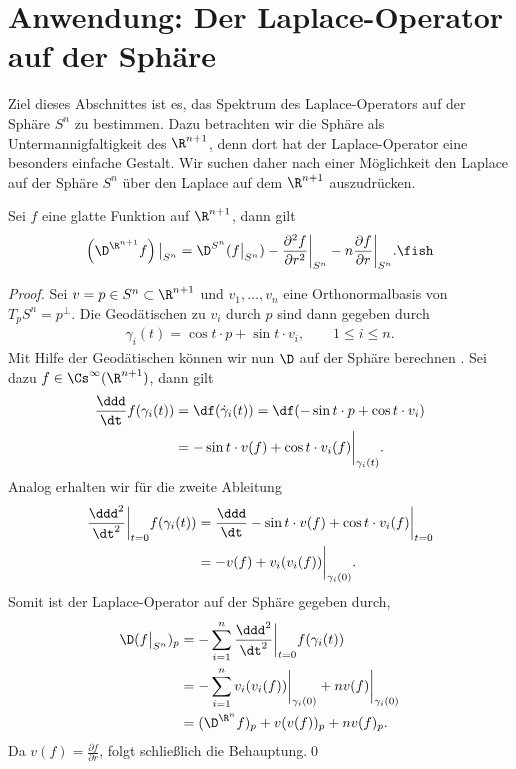\documentclass[%
	paper=a5,%
	fleqn,%
	DIV=18,%
	BCOR=0mm,
	fontsize=11pt,
	titlepage=false,%
	bibliography=totoc,
	DIV=18,%
	twoside=true,
	pdftitle=Riemannsche Geometrie,
	pdfauthor=Uwe Semmelmann,
	numbers=noendperiod]%
	{scrbook}
\begin{document}
\section{Anwendung: Der Laplace-Operator auf der Sphäre}

Ziel dieses Abschnittes ist es, das Spektrum des Laplace-Operators auf der Sphäre $S^n$ zu bestimmen. Dazu betrachten wir die Sphäre als Untermannigfaltigkeit des $\R^{n+1}$, denn dort hat der Laplace-Operator eine besonders einfache Gestalt.
Wir suchen daher nach einer Möglichkeit den Laplace auf der Sphäre $S^n$ über den Laplace auf dem $\R^{n+1}$ auszudrücken.

\begin{prop}
Sei $f$ eine glatte Funktion auf $\R^{n+1}$, dann gilt
\begin{align*}
\left(\D^{\R^{n+1}}f\right)\big|_{S^n}  = 
\D^{S^n}(f\big|_{S^n}) - \frac{\partial^2 f}{\partial r^2}\bigg|_{S^n} - 
n\frac{\partial f}{\partial r}\bigg|_{S^n}.\fish
\end{align*}
\end{prop}

\begin{proof}
Sei $v=p\in S^n\subset\R^{n+1}$ und $v_{1},\ldots,v_{n}$ eine Orthonormalbasis von $T_{p}S^n = p^\bot$. Die Geodätischen zu $v_{i}$ durch $p$ sind dann gegeben durch
\begin{align*}
\gamma_{i}(t) = \cos t \cdot p + \sin t \cdot v_{i},\qquad 1\le i\le n.
\end{align*}
Mit Hilfe der Geodätischen können wir nun $\D$ auf der Sphäre berechnen . Sei dazu $f\in\Cs^\infty(\R^{n+1})$, dann gilt
\begin{align*}
\frac{\ddd}{\dt} f(\gamma_{i}(t)) &= \df(\dot\gamma_{i}(t)) = 
\df(-\sin t\cdot p + \cos t \cdot v_{i})\\
&= -\sin t \cdot v(f) + \cos t \cdot v_{i}(f)\bigg|_{\gamma_{i}(t)}.
\end{align*}
Analog erhalten wir für die zweite Ableitung
\begin{align*}
\frac{\ddd^2}{\dt^2}\bigg|_{t=0} f(\gamma_{i}(t)) &=
\frac{\ddd}{\dt}
-\sin t \cdot v(f) + \cos t \cdot v_{i}(f)\bigg|_{t=0}\\
&= -v(f) + v_{i}(v_{i}(f))\bigg|_{\gamma_{i}(0)}.
\end{align*}
Somit ist der Laplace-Operator auf der Sphäre gegeben durch,
\begin{align*}
\D(f\big|_{S^n})_{p} &=
-\sum_{i=1}^n 
\frac{\ddd^2}{\dt^2}\bigg|_{t=0} f(\gamma_{i}(t))\\
&= -\sum_{i=1}^n v_{i}(v_{i}(f))\bigg|_{\gamma_{i}(0)} + n v(f)\bigg|_{\gamma_{i}(0)}\\
&= (\D^{\R^n} f)_{p} + v(v(f))_{p} + nv(f)_{p}.
\end{align*}
Da $v(f) = \frac{\partial f}{\partial r}$, folgt schließlich die Behauptung.\qed
\end{proof}
\end{document}
